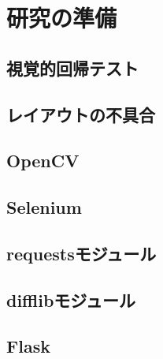 \chapter{研究の準備}\label{cha:Preparation}

\section{視覚的回帰テスト}\label{sec:vrt}

\section{レイアウトの不具合}\label{sec:layout effect}

\section{OpenCV}\label{sec:OpenCV}

\section{Selenium}\label{sec:Selenium}

\section{requestsモジュール}\label{sec:requests}

\section{difflibモジュール}\label{sec:difflib}

\section{Flask}\label{sec:Flask}